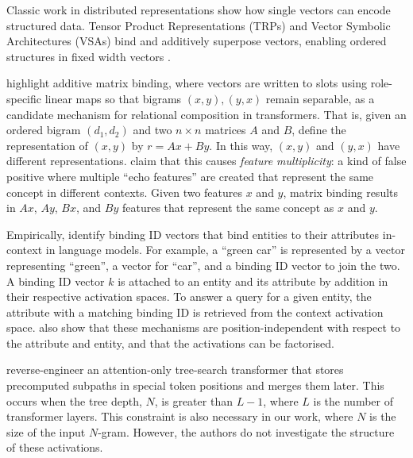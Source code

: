 Classic work in distributed representations show how single vectors can encode structured data. Tensor Product Representations (TRPs) and Vector Symbolic Architectures (VSAs) bind and additively superpose vectors, enabling ordered structures in fixed width vectors \citep{smolensky1990tpr, plate1995hrr, kanerva2009hdc}.

\citet{wattenberg2024relational} highlight additive matrix binding, where vectors are written to slots using role-specific linear maps so that bigrams $(x, y),(y,x)$ remain separable, as a candidate mechanism for relational composition in transformers. That is, given an ordered bigram $(d_1, d_2)$ and two $n \times n$ matrices $A$ and $B$, define the representation of $(x, y)$ by
\(
r = Ax + By
\).
In this way, $(x, y)$ and $(y, x)$ have different representations.
\citet{wattenberg2024relational} claim that this causes \textit{feature multiplicity}: a kind of false positive where multiple ``echo features'' are created that represent the same concept in different contexts. Given two features $x$ and $y$, matrix binding results in $Ax$, $Ay$, $Bx$, and $By$ features that represent the same concept as $x$ and $y$. 

Empirically, \citet{feng2023language, prakash2023fine} identify binding ID vectors that bind entities to their attributes in-context in language models. For example, a ``green car'' is represented by a vector representing ``green'', a vector for ``car'', and a binding ID vector to join the two. A binding ID vector $k$ is attached to an entity and its attribute by addition in their respective activation spaces. To answer a query for a given entity, the attribute with a matching binding ID is retrieved from the context activation space. \citet{feng2023language} also show that these mechanisms are position-independent with respect to the attribute and entity, and that the activations can be factorised.

\citet{brinkmann2024mechanistic} reverse-engineer an attention-only tree-search transformer that stores precomputed subpaths in special token positions and merges them later. This occurs when the tree depth, $N$, is greater than $L-1$, where $L$ is the number of transformer layers. This constraint is also necessary in our work, where $N$ is the size of the input $N$-gram. However, the authors do not investigate the structure of these activations.

